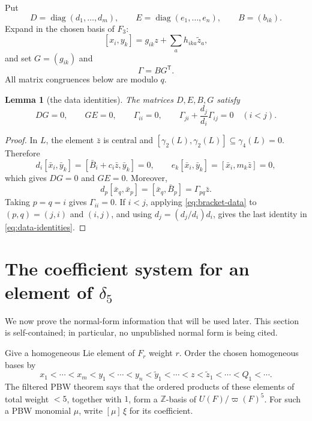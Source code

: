 \documentclass[11pt]{amsart}
\newtheorem{lemma}[theorem]{Lemma}
\theoremstyle{definition}
\theoremstyle{remark}
\newcommand{\Z}{\mathbb Z}
\newcommand{\gam}{\gamma}
\newcommand{\del}{\delta}
\newcommand{\ww}{\varpi}
\newcommand{\coeff}[1]{[#1]\,}
\begin{document}
Put
\[
 D=\operatorname{diag}(d_1,\ldots,d_m),\qquad
 E=\operatorname{diag}(e_1,\ldots,e_n),\qquad
 B=(b_{ik}).
\]
Expand in the chosen basis of \(F_3\):
\[
 [x_i,y_k]=g_{ik}z+\sum_a h_{ika}\widetilde z_a,
\]
and set \(G=(g_{ik})\) and
\[
                              \Gamma=BG^{\mathsf T}.
\]
All matrix congruences below are modulo \(q\).

\begin{lemma}[the data identities]\label{lem:data}
The matrices \(D,E,B,G\) satisfy
\begin{equation}\label{eq:data-identities}
 DG=0,\qquad GE=0,\qquad
 \Gamma_{ii}=0,\qquad
 \Gamma_{ji}+\frac{d_j}{d_i}\Gamma_{ij}=0\quad(i<j).
\end{equation}
\end{lemma}

\begin{proof}
In \(L\), the element \(\bar z\) is central and
\([\gam_2(L),\gam_2(L)]\subseteq\gam_4(L)=0\).  Therefore
\[
 d_i[\bar x_i,\bar y_k]=[\bar B_i+c_i\bar z,\bar y_k]=0,
 \qquad
 e_k[\bar x_i,\bar y_k]=[\bar x_i,m_k\bar z]=0,
\]
which gives \(DG=0\) and \(GE=0\).  Moreover,
\begin{equation}\label{eq:bracket-data}
 d_p[\bar x_q,\bar x_p]
 =[\bar x_q,\bar B_p]
 =\Gamma_{pq}\bar z.
\end{equation}
Taking \(p=q=i\) gives \(\Gamma_{ii}=0\).  If \(i<j\), applying
\eqref{eq:bracket-data} to \((p,q)=(j,i)\) and \((i,j)\), and using
\(d_j=(d_j/d_i)d_i\), gives the last identity in
\eqref{eq:data-identities}.
\end{proof}

\section{The coefficient system for an element of
\texorpdfstring{\(\del_5\)}{delta 5}}

We now prove the normal-form information that will be used later.
This section is self-contained; in particular, no unpublished normal
form is being cited.

Give a homogeneous Lie element of \(F_r\) weight \(r\).  Order the
chosen homogeneous bases by
\[
 x_1<\cdots<x_m<y_1<\cdots<y_n
 <\widetilde y_1<\cdots<z<\widetilde z_1<\cdots<Q_1<\cdots .
\]
The filtered PBW theorem \cite[Chapter~I, \S2.7]{Bou} says that the
ordered products of these elements of total weight \(<5\), together
with \(1\), form a \(\Z\)-basis of \(U(F)/\ww(F)^5\).  For such a PBW
monomial \(\mu\), write \(\coeff{\mu}\xi\) for its coefficient.
\end{document}
